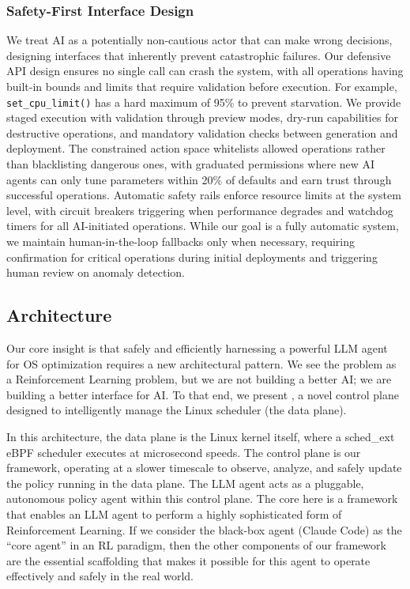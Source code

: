 \subsubsection{Safety-First Interface Design}

We treat AI as a potentially non-cautious actor that can make wrong decisions, designing interfaces that inherently prevent catastrophic failures. Our defensive API design ensures no single call can crash the system, with all operations having built-in bounds and limits that require validation before execution. For example, \texttt{set\_cpu\_limit()} has a hard maximum of 95\% to prevent starvation. We provide staged execution with validation through preview modes, dry-run capabilities for destructive operations, and mandatory validation checks between generation and deployment. The constrained action space whitelists allowed operations rather than blacklisting dangerous ones, with graduated permissions where new AI agents can only tune parameters within 20\% of defaults and earn trust through successful operations. Automatic safety rails enforce resource limits at the system level, with circuit breakers triggering when performance degrades and watchdog timers for all AI-initiated operations. While our goal is a fully automatic system, we maintain human-in-the-loop fallbacks only when necessary, requiring confirmation for critical operations during initial deployments and triggering human review on anomaly detection.


\subsection{\sys Architecture}

Our core insight is that safely and efficiently harnessing a powerful LLM agent for OS optimization requires a new architectural pattern. We see the problem as a Reinforcement Learning problem, but we are not building a better AI; we are building a better interface for AI. To that end, we present \sys, a novel control plane designed to intelligently manage the Linux scheduler (the data plane).

In this architecture, the data plane is the Linux kernel itself, where a sched\_ext eBPF scheduler executes at microsecond speeds. The control plane is our framework, operating at a slower timescale to observe, analyze, and safely update the policy running in the data plane. The LLM agent acts as a pluggable, autonomous policy agent within this control plane. The core here is a framework that enables an LLM agent to perform a highly sophisticated form of Reinforcement Learning. If we consider the black-box agent (Claude Code) as the ``core agent'' in an RL paradigm, then the other components of our framework are the essential scaffolding that makes it possible for this agent to operate effectively and safely in the real world.

